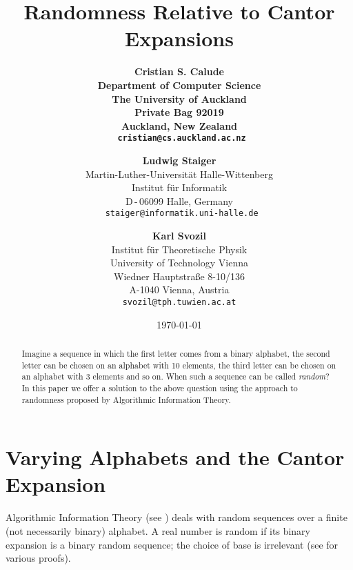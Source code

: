 \documentclass[11pt,a4paper,twoside]{article}
\begin{document}
\title{\bf Randomness  Relative to Cantor Expansions}

\author{\bfseries Cristian S. Calude\\Department of Computer
Science\\The University of Auckland\\Private Bag 92019\\Auckland, New
Zealand\\
{\tt
cristian@cs.auckland.ac.nz}\and {\bf Ludwig Staiger}\\
Martin-Luther-Universit\"at
Halle-Wittenberg\\ Institut f\"ur Informatik\\ {D\,-\,06099} Halle,
Germany\\
{\tt
staiger@informatik.uni-halle.de}
\and
{\bf Karl  Svozil}\\
Institut f\"ur Theoretische Physik\\
 University of Technology Vienna\\
 Wiedner Hauptstra\ss e 8-10/136\\
 A-1040 Vienna, Austria\\{\tt svozil@tph.tuwien.ac.at}
} \date{\today}
\maketitle
\noindent
\parindent0pt \thispagestyle{empty}

\begin{abstract}
Imagine a sequence in which the first letter comes from a binary alphabet,
the second letter can be chosen on an alphabet with 10 elements, the
third letter  can be chosen on an alphabet with 3 elements and so on.
When such a sequence can be called {\it random}? In this paper we offer
a solution to the above question using the approach to randomness proposed
by
Algorithmic Information Theory.
\end{abstract}



\section{Varying Alphabets and the Cantor Expansion}


Algorithmic Information Theory (see \cite{ch8,gregc2,Ca})
deals with random sequences over a finite (not necessarily binary)
alphabet. A real number is random if its binary expansion is
a binary random sequence; the choice of base is irrelevant
(see \cite{Ca} for various proofs).
\end{document}
